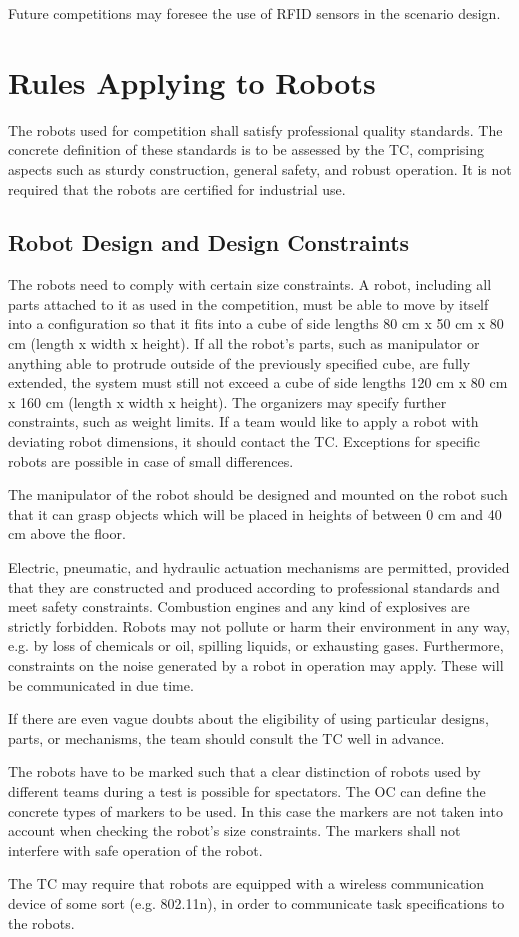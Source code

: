 Future competitions may foresee the use of RFID sensors in the scenario design.


\section{Rules Applying to Robots}
The robots used for competition shall satisfy professional quality standards. The concrete definition of these standards is to be assessed by the TC, comprising aspects such as sturdy construction, general safety, and robust operation. It is not required that the robots are certified for industrial use.

\subsection{Robot Design and Design Constraints}
The robots need to comply with certain size constraints. A robot, including all parts attached to it as used in the competition, must be able to move by itself into a configuration so that it fits into a cube of side lengths 80 cm x 50 cm x 80 cm (length x width x height). If all the robot’s parts, such as manipulator or anything able to protrude outside of the previously specified cube, are fully extended, the system must still not exceed a cube of side lengths 120 cm x 80 cm x 160 cm (length x width x height). The organizers may specify further constraints, such as weight limits. If a team would like to apply a robot with deviating robot dimensions, it should contact the TC. Exceptions for specific robots are possible in case of small differences.

\par
The manipulator of the robot should be designed and mounted on the robot such that it can grasp objects which will be placed in heights of between 0 cm and 40 cm above the floor.
\par
Electric, pneumatic, and hydraulic actuation mechanisms are permitted, provided that they are constructed and produced according to professional standards and meet safety constraints. Combustion engines and any kind of explosives are strictly forbidden. Robots may not pollute or harm their environment in any way, e.g. by loss of chemicals or oil, spilling liquids, or exhausting gases. Furthermore, constraints on the noise generated by a robot in operation may apply. These will be communicated in due time.
\par
If there are even vague doubts about the eligibility of using particular designs, parts, or mechanisms, the team should consult the TC well in advance.
\par
The robots have to be marked such that a clear distinction of robots used by different teams during a test is possible for spectators. The OC can define the concrete types of markers to be used. In this case the markers are not taken into account when checking the robot’s size constraints. The markers shall not interfere with safe operation of the robot.
\par
The TC may require that robots are equipped with a wireless communication device of some sort (e.g. 802.11n), in order to communicate task specifications to the robots.

